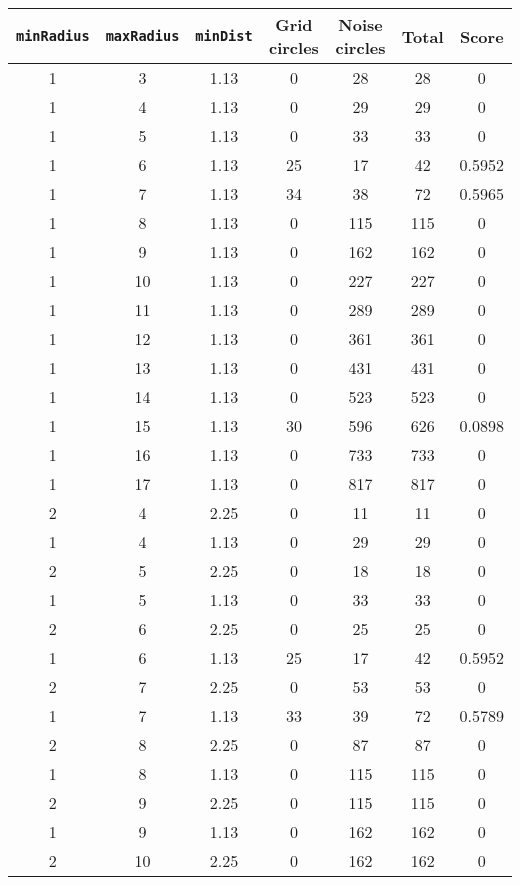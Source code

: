 \documentclass[letterpaper, 12pt]{article}
\begin{document}
\begin{longtable}{|c|c|c|c|c|c|c|}
\hline
\textbf{\texttt{minRadius}} & \textbf{\texttt{maxRadius}} & \textbf{\texttt{minDist}} & \textbf{Grid circles} & \textbf{Noise circles} & \textbf{Total} & \textbf{Score} \\
\hline
1 & 3 & 1.13 & 0 & 28 & 28 & 0 \\
\hline
1 & 4 & 1.13 & 0 & 29 & 29 & 0 \\
\hline
1 & 5 & 1.13 & 0 & 33 & 33 & 0 \\
\hline
1 & 6 & 1.13 & 25 & 17 & 42 & 0.5952 \\
\hline
1 & 7 & 1.13 & 34 & 38 & 72 & 0.5965 \\
\hline
1 & 8 & 1.13 & 0 & 115 & 115 & 0 \\
\hline
1 & 9 & 1.13 & 0 & 162 & 162 & 0 \\
\hline
1 & 10 & 1.13 & 0 & 227 & 227 & 0 \\
\hline
1 & 11 & 1.13 & 0 & 289 & 289 & 0 \\
\hline
1 & 12 & 1.13 & 0 & 361 & 361 & 0 \\
\hline
1 & 13 & 1.13 & 0 & 431 & 431 & 0 \\
\hline
1 & 14 & 1.13 & 0 & 523 & 523 & 0 \\
\hline
1 & 15 & 1.13 & 30 & 596 & 626 & 0.0898 \\
\hline
1 & 16 & 1.13 & 0 & 733 & 733 & 0 \\
\hline
1 & 17 & 1.13 & 0 & 817 & 817 & 0 \\
\hline
2 & 4 & 2.25 & 0 & 11 & 11 & 0 \\
\hline
1 & 4 & 1.13 & 0 & 29 & 29 & 0 \\
\hline
2 & 5 & 2.25 & 0 & 18 & 18 & 0 \\
\hline
1 & 5 & 1.13 & 0 & 33 & 33 & 0 \\
\hline
2 & 6 & 2.25 & 0 & 25 & 25 & 0 \\
\hline
1 & 6 & 1.13 & 25 & 17 & 42 & 0.5952 \\
\hline
2 & 7 & 2.25 & 0 & 53 & 53 & 0 \\
\hline
1 & 7 & 1.13 & 33 & 39 & 72 & 0.5789 \\
\hline
2 & 8 & 2.25 & 0 & 87 & 87 & 0 \\
\hline
1 & 8 & 1.13 & 0 & 115 & 115 & 0 \\
\hline
2 & 9 & 2.25 & 0 & 115 & 115 & 0 \\
\hline
1 & 9 & 1.13 & 0 & 162 & 162 & 0 \\
\hline
2 & 10 & 2.25 & 0 & 162 & 162 & 0 \\

\end{longtable}
\end{document}
